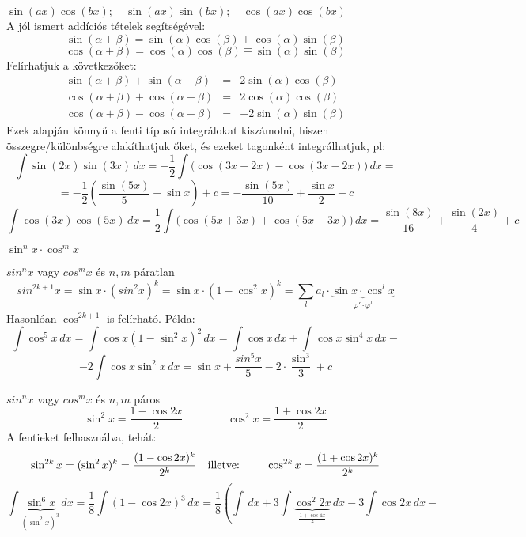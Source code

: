 \documentclass[a4paper,12pt,twoside]{book}
\theoremstyle{break}
\theoremstyle{plain}
\newcommand{\integ}[1]{\ensuremath{\int #1\, dx}}
\begin{document}
\begin{list}{.}{\leftmargin=1.5em} %
 \item $\boxed{\sin(ax)\cos(bx); \quad \sin(ax)\sin(bx); \quad \cos(ax)\cos(bx)}$\\[+3pt]
  A jól ismert addíciós tételek segítségével:
  \[\sin(\alpha\pm\beta) = \sin(\alpha)\cos(\beta)\pm\cos(\alpha)\sin(\beta)\]
  \[\cos(\alpha\pm\beta) = \cos(\alpha)\cos(\beta)\mp\sin(\alpha)\sin(\beta)\]
  Felírhatjuk a következőket:
  \[\begin{array}{rcl}
      \sin(\alpha+\beta)+\sin(\alpha-\beta) &=& 2\sin(\alpha)\cos(\beta)\\[+4pt]
      \cos(\alpha+\beta)+\cos(\alpha-\beta) &=& 2\cos(\alpha)\cos(\beta)\\[+4pt]
      \cos(\alpha+\beta)-\cos(\alpha-\beta) &=& -2\sin(\alpha)\sin(\beta)
    \end{array}\]
  Ezek alapján könnyű a fenti típusú integrálokat kiszámolni, hiszen összegre/különb\-ségre alakíthatjuk őket, és ezeket tagonként integrálhatjuk, pl:
  \[\integ{\sin(2x)\sin(3x)} = -\frac{1}{2}\integ{\Big(\cos(3x+2x)-\cos(3x-2x)\Big)} = \]
  \[ = -\frac{1}{2}\left(\frac{\sin(5x)}{5}-\sin x\right) +c = -\frac{\sin(5x)}{10}+\frac{\sin x}{2} +c\]
  \[\integ{\cos(3x)\cos(5x)} = \frac{1}{2}\integ{\Big(\cos(5x+3x)+\cos(5x-3x)\Big)} = \frac{\sin(8x)}{16}+\frac{\sin(2x)}{4} + c\]
 \item $\boxed{\sin^n x\cdot \cos^m x}$
  \begin{list}{)}{\leftmargin=1.5em}
    \item $sin^n x$ vagy $cos^m x$ és $n,m$ páratlan
    \[sin^{2k+1} x = \sin x\cdot (sin^2 x)^k = \sin x\cdot(1-\cos^2 x)^k = \sum_{l} a_l\cdot\underbrace{\sin x\cdot \cos^l x}_{\varphi'\cdot\varphi^l}\]
    Hasonlóan $\cos^{2k+1}$ is felírható. Példa:
      \[\integ{\cos^5 x} = \integ{\cos x(1-\sin^2 x)^2} = \integ{\cos x} + \integ{\cos x\sin^4 x} - \]
      \[-2\integ{\cos x\sin^2 x} = \sin x + \frac{sin^5 x}{5} - 2\cdot\frac{\sin^3}{3} + c\]
    \item $sin^n x$ vagy $cos^m x$ és $n,m$ páros
      \[\sin^2 x = \frac{1-\cos 2x}{2} \qquad\qquad \cos^2 x = \frac{1+\cos 2x}{2}\]
    A fentieket felhasználva, tehát:
      \[\sin^{2k} x = (\sin^2 x)^k = \frac{(1-\cos 2x)^k}{2^k} \quad\hbox{illetve: }\qquad \cos^{2k} x = \frac{(1+\cos 2x)^k}{2^k}\]
    \[\integ{\underbrace{\sin^6 x}_{(\sin^2 x)^3}} = \frac{1}{8}\integ{(1-\cos 2x)^3} = \frac{1}{8}\left(\integ{}+3\integ{\underbrace{\cos^2 2x}_{\frac{1+\cos 4x}{2}}}- 3\integ{\cos 2x}-\right.\]

\end{list}
\end{list}
\end{document}
